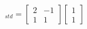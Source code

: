\documentclass[preview]{standalone}
\begin{document}
\begin{align*}
[\vec{v}]_{std} = \begin{bmatrix} 2 & -1 \\ 1 & 1 \end{bmatrix} \begin{bmatrix} 1 \\ 1 \end{bmatrix}
\end{align*}
\end{document}
